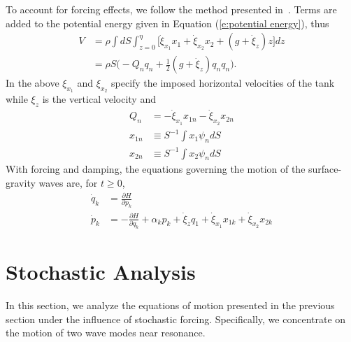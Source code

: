 To account for forcing effects, we follow the method presented in~\citet{miles76:_nonlin}. Terms are added to the potential energy given in Equation (\ref{e:potential energy}), thus
\begin{equation}
\begin{split}
V &= \rho \int dS \int^{\eta}_{z = 0} \bigl[ \dot{\xi}_{x_1}
x_1 + \dot{\xi}_{x_2} x_2 + (g + \dot{\xi}_z) z \bigr] dz\\
&= \rho S \bigl( - Q_n q_n + \frac12 (g + \dot{\xi}_z) q_n q_n
\bigr)\label{e:V with forcing}.
\end{split}
\end{equation}
In the above $\xi_{x_1}$ and $\xi_{x_2}$ specify the imposed horizontal velocities of the tank while $\xi_z$ is the vertical velocity and
\begin{align}
Q_n & = - \dot{\xi}_{x_1} x_{1 n} - \dot{\xi}_{x_2} x_{2
n}\\ x_{1 n} & \equiv S^{- 1} \int x_1 \psi_n dS\label{e:SI def}\\ x_{2 n} &
\equiv S^{- 1} \int x_2 \psi_n dS
\end{align}
With forcing and damping, the equations governing the motion of the
surface-gravity waves are, for $t\geq0$,
\begin{align}
\dot{q}_k &= \frac{\partial H}{\partial p_k}\\
\dot{p}_k &= -\frac{\partial H}{\partial q_k} + \alpha_k p_k +
\dot{\xi}_z q_1 + \dot{\xi}_{x_1} x_{1k} + \dot{\xi}_{x_2} x_{2k}
\end{align}

\section{Stochastic Analysis}
In this section, we analyze the equations of motion presented in the
previous section under the influence of stochastic
forcing. Specifically, we concentrate on the motion of two wave modes
near resonance.

